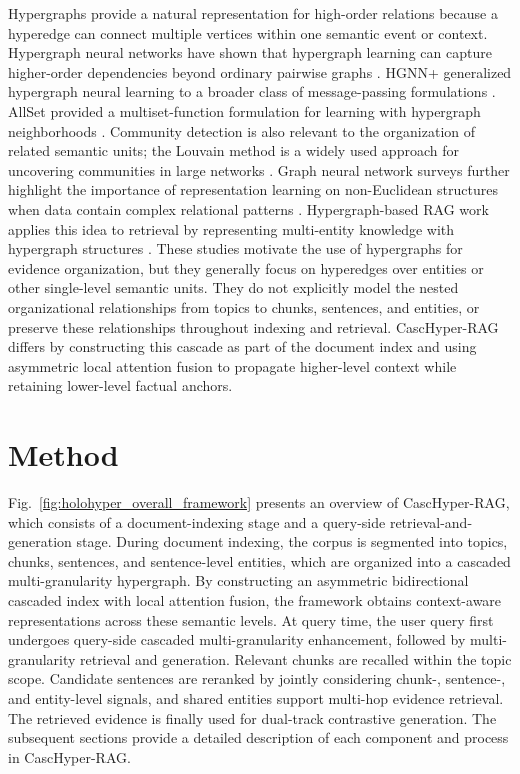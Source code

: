\documentclass[a4paper,fleqn]{cas-dc}
\begin{document}
Hypergraphs provide a natural representation for high-order relations because a hyperedge can connect multiple vertices within one semantic event or context. Hypergraph neural networks have shown that hypergraph learning can capture higher-order dependencies beyond ordinary pairwise graphs \citep{Feng2019HGNN}. HGNN+ generalized hypergraph neural learning to a broader class of message-passing formulations \citep{Gao2023HGNNPlus}. AllSet provided a multiset-function formulation for learning with hypergraph neighborhoods \citep{Chien2022AllSet}. Community detection is also relevant to the organization of related semantic units; the Louvain method is a widely used approach for uncovering communities in large networks \citep{Blondel2008Louvain}. Graph neural network surveys further highlight the importance of representation learning on non-Euclidean structures when data contain complex relational patterns \citep{Wu2021GNNSurvey}. Hypergraph-based RAG work applies this idea to retrieval by representing multi-entity knowledge with hypergraph structures \citep{Feng2026HyperRAG}. These studies motivate the use of hypergraphs for evidence organization, but they generally focus on hyperedges over entities or other single-level semantic units. They do not explicitly model the nested organizational relationships from topics to chunks, sentences, and entities, or preserve these relationships throughout indexing and retrieval. CascHyper-RAG differs by constructing this cascade as part of the document index and using asymmetric local attention fusion to propagate higher-level context while retaining lower-level factual anchors.

\section{Method}\label{sec:method}

Fig.~\ref{fig:holohyper_overall_framework} presents an overview of CascHyper-RAG, which consists of a document-indexing stage and a query-side retrieval-and-generation stage. During document indexing, the corpus is segmented into topics, chunks, sentences, and sentence-level entities, which are organized into a cascaded multi-granularity hypergraph. By constructing an asymmetric bidirectional cascaded index with local attention fusion, the framework obtains context-aware representations across these semantic levels. At query time, the user query first undergoes query-side cascaded multi-granularity enhancement, followed by multi-granularity retrieval and generation. Relevant chunks are recalled within the topic scope. Candidate sentences are reranked by jointly considering chunk-, sentence-, and entity-level signals, and shared entities support multi-hop evidence retrieval. The retrieved evidence is finally used for dual-track contrastive generation. The subsequent sections provide a detailed description of each component and process in CascHyper-RAG.
\end{document}
